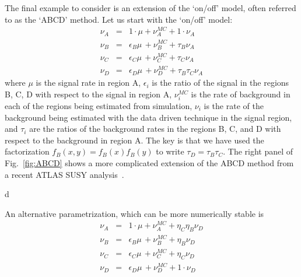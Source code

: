 The final example to consider is an extension of the `on/off' model, often referred to as the `ABCD' method.  Let us start with the `on/off' model:
\begin{eqnarray}
\nu_A &=& 1\cdot\mu + \nu_A^{MC} + 1\cdot\nu_A \\\nonumber
\nu_B &=& \epsilon_B\mu \,+ \nu_B^{MC} + \tau_B\nu_A \\\nonumber
\nu_C &=& \epsilon_C\mu \,+ \nu_C^{MC} + \tau_C\nu_A \\\nonumber
\nu_D &=& \epsilon_D\mu \,+ \nu_D^{MC} + \tau_B\tau_C\nu_A 
\end{eqnarray}
where $\mu$ is the signal rate in region A, $\epsilon_i$ is the ratio of the signal in the regions B, C, D with respect to the signal in region A, $\nu_i^{MC}$ is the rate of background in each of the regions being estimated from simulation,  $\nu_i$ is the rate of the background being estimated with the data driven technique in the signal region, and $\tau_i$ are the ratios of the background rates in the regions B, C, and D with respect to the background in region A.  The key is that we have used the factorization $f_B(x,y)=f_B(x)f_B(y)$ to write $\tau_D=\tau_B\tau_C$.  The right panel of Fig.~\ref{fig:ABCD} shows a more complicated extension of the ABCD method from a recent ATLAS SUSY analysis~\cite{ATLAS:2011ad}.


d


An alternative parametrization, which can be more numerically stable is\\
\begin{eqnarray}
\nu_A &=& 1\cdot\mu + \nu_A^{MC} + \eta_C\eta_B\nu_D \\\nonumber
\nu_B &=& \epsilon_B\mu \,+ \nu_B^{MC} + \eta_B\nu_D \\\nonumber
\nu_C &=& \epsilon_C\mu \,+ \nu_C^{MC} + \eta_C\nu_D \\\nonumber
\nu_D &=& \epsilon_D\mu \,+ \nu_D^{MC} + 1\cdot\nu_D 
\end{eqnarray}
